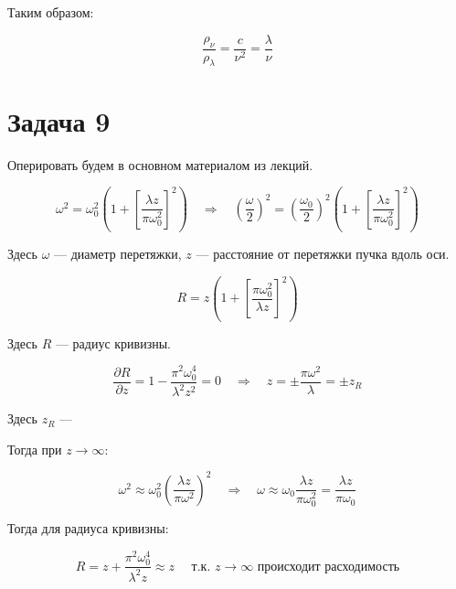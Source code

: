 \documentclass[a4paper, 12pt]{article}
\newcommand{\qrq}
{\ensuremath{\quad \Rightarrow \quad}} %
\begin{document}
Таким образом:

\begin{equation}
	\frac{\rho_\nu}{\rho_\lambda} = \frac{c}{\nu^2} = \frac{\lambda}{\nu}
\end{equation}

\section{Задача 9}

Оперировать будем в основном материалом из лекций.

\begin{equation}
	\omega^2 = \omega_0^2 \left(1 + \left[\frac{\lambda z}{\pi \omega_0^2}\right]^2\right) \qrq \left(\frac{\omega}{2}\right)^2 = \left(\frac{\omega_0}{2}\right)^2 \left(1 + \left[\frac{\lambda z}{\pi \omega_0^2}\right]^2\right)
\end{equation}

Здесь $\omega$ --- диаметр перетяжки, $z$ --- расстояние от перетяжки пучка вдоль оси.

\begin{equation}
	R = z \left(1 + \left[\frac{\pi \omega_0^2}{\lambda z}\right]^ 2\right)
\end{equation}

Здесь $R$ --- радиус кривизны.

\begin{equation}
	\frac{\partial R}{\partial z} = 1 - \frac{\pi^2 \omega_0^4}{\lambda^2 z^2} = 0 \qrq z = \pm \frac{\pi \omega^2}{\lambda} = \pm z_R
\end{equation}

Здесь $z_R$ --- 

Тогда при $z \rightarrow \infty$:

\begin{equation}
	\omega^2 \approx \omega_0^2 \left(\frac{\lambda z}{\pi \omega^2}\right)^2 \qrq \omega \approx \omega_0 \frac{\lambda z}{\pi\omega_0^2} = \frac{\lambda z}{\pi \omega_0}
\end{equation}

Тогда для радиуса кривизны:

\begin{equation}
	R = z + \frac{\pi^2\omega_0^4}{\lambda^2 z} \approx z \quad \text{ т.к. $z\rightarrow \infty$ происходит расходимость}
\end{equation}


\newpage

\begin{thebibliography}{}
	
\end{thebibliography}
\end{document}
